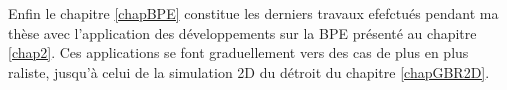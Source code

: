 Enfin le chapitre \ref{chapBPE} constitue les derniers travaux efefctués pendant ma thèse avec l'application des développements sur la BPE présenté au chapitre \ref{chap2}. Ces applications se font graduellement vers des cas de plus en plus raliste, jusqu'à celui de la simulation 2D du détroit du chapitre \ref{chapGBR2D}.











